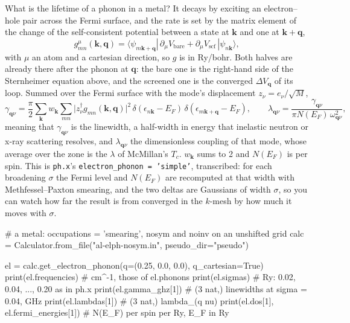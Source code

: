 \documentclass[11pt,a4paper]{article}
\newcommand{\code}[1]{\texttt{\small #1}}
\begin{document}
What is the lifetime of a phonon in a metal? It decays by exciting an
electron--hole pair across the Fermi surface, and the rate is set by the matrix
element of the change of the self-consistent potential between a state at
$\mathbf k$ and one at $\mathbf k+\mathbf q$,
\begin{equation*}
g^{\mu}_{mn}(\mathbf k,\mathbf q) = \langle\psi_{m\mathbf k+\mathbf q}|
  \,\partial_{\mu}V_{\mathrm{bare}} + \partial_{\mu}V_{\mathrm{scf}}\,|\psi_{n\mathbf k}\rangle ,
\end{equation*}
with $\mu$ an atom and a cartesian direction, so $g$ is in Ry/bohr. Both
halves are already there after the phonon at $\mathbf q$: the bare one is the
right-hand side of the Sternheimer equation above, and the screened one is the
converged $\Delta V_{\mathbf q}$ of its loop. Summed over the Fermi surface
with the mode's displacement $z_\nu = e_\nu/\sqrt M$,
\begin{equation*}
\gamma_{\mathbf q\nu} = \frac{\pi}{2}\sum_{\mathbf k}w_{\mathbf k}\sum_{mn}
  \big|z_\nu^{\dagger} g_{mn}(\mathbf k,\mathbf q)\big|^2\,
  \delta(\epsilon_{n\mathbf k}-E_F)\,\delta(\epsilon_{m\mathbf k+\mathbf q}-E_F),
\qquad
\lambda_{\mathbf q\nu} = \frac{\gamma_{\mathbf q\nu}}{\pi N(E_F)\,\omega_{\mathbf q\nu}^2},
\end{equation*}
meaning that $\gamma_{\mathbf q\nu}$ is the linewidth, a half-width in
energy that inelastic neutron or x-ray scattering resolves, and
$\lambda_{\mathbf q\nu}$ the dimensionless coupling of that mode, whose
average over the zone is the $\lambda$ of McMillan's $T_c$. $w_{\mathbf k}$
sums to 2 and $N(E_F)$ is per spin. This is \code{ph.x}'s
\code{electron\_phonon = 'simple'}, transcribed: for each broadening
$\sigma$ the Fermi level and $N(E_F)$ are recomputed at that width with
Methfessel--Paxton smearing, and the two deltas are Gaussians of width
$\sigma$, so you can watch how far the result is from converged in the
$k$-mesh by how much it moves with $\sigma$.

\begin{pycode}
# a metal: occupations = 'smearing', nosym and noinv on an unshifted grid
calc = Calculator.from_file("al-elph-nosym.in", pseudo_dir="pseudo")

el = calc.get_electron_phonon(q=(0.25, 0.0, 0.0), q_cartesian=True)
print(el.frequencies)        # cm^-1, those of el.phonons
print(el.sigmas)             # Ry: 0.02, 0.04, ..., 0.20 as in ph.x
print(el.gamma_ghz[1])       # (3 nat,) linewidths at sigma = 0.04, GHz
print(el.lambdas[1])         # (3 nat,) lambda_(q nu)
print(el.dos[1], el.fermi_energies[1])   # N(E_F) per spin per Ry, E_F in Ry
\end{pycode}
\end{document}
